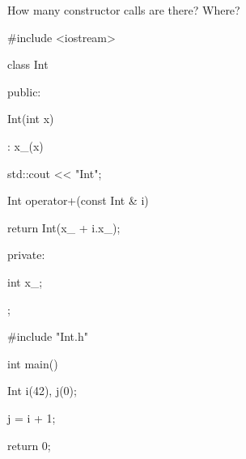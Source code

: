 How many constructor calls are there? Where?



\begin{consolethree}[escapeinside=||]

#include <iostream>



class Int

{

public:

    Int(int x)

        : x_(x)

    {

        std::cout << "Int\n";

    }

    Int operator+(const Int & i)

    {

        return Int(x_ + i.x_);

    }

private:

    int x_;

};

\end{consolethree}



\begin{consolethree}[escapeinside=||]

#include "Int.h"



int main()

{

    Int i(42), j(0);

    j = i + 1;

    return 0;

}

\end{consolethree}

